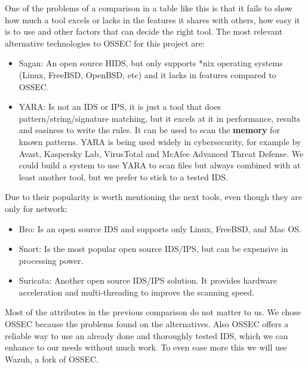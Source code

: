 \linej
\linej
One of the problems of a comparison in a table like this is that it fails to show how much a tool excels or lacks in the features it shares with others, how easy it is to use and other factors that can decide the right tool. The most relevant alternative technologies to OSSEC for this project are\cite{comparison_tools}:
\begin{itemize}
	\item Sagan: An open source HIDS, but only supports *nix operating systems (Linux, FreeBSD, OpenBSD, etc) and it lacks in features compared to OSSEC.
	\item YARA: Is not an IDS or IPS, it is just a tool that does pattern/string/signature matching, but it excels at it in performance, results and easiness to write the rules. It can be used to scan the \textbf{memory} for known patterns. YARA is being used widely in cybersecurity, for example by Avast, Kaspersky Lab, VirusTotal and McAfee Advanced Threat Defense\cite{who_is_using_yara}. We could build a system to use YARA to scan files but always combined with at least another tool, but we prefer to stick to a tested IDS.
\end{itemize}
\linej
Due to their popularity is worth mentioning the next tools, even though they are only for network:
\begin{itemize}
	\item Bro: Is an open source IDS and supports only Linux, FreeBSD, and Mac OS.
	\item Snort: Is the most popular open source IDS/IPS, but can be expensive in processing power.
	\item Suricata: Another open source IDS/IPS solution. It provides hardware acceleration and multi-threading to improve the scanning speed.
\end{itemize}
\linej
Most of the attributes in the previous comparison do not matter to us.
We chose OSSEC because the problems found on the alternatives.
Also OSSEC offers a reliable way to use an already done and thoroughly tested IDS, which we can enhance to our needs without much work.
To even ease more this we will use Wazuh, a fork of OSSEC.

